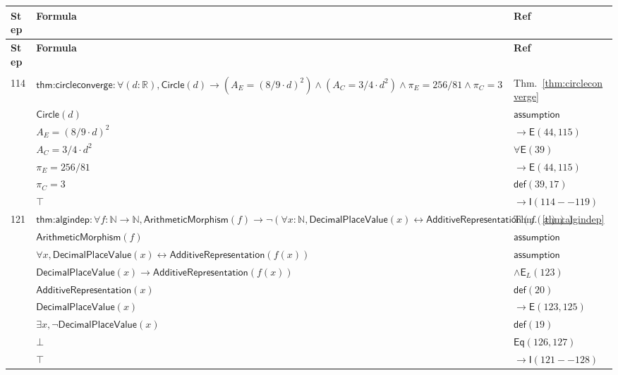 \documentclass[12pt]{amsart}
\newcommand{\br}{,\allowbreak}
\newcommand{\R}{\mathbb{R}}
\newcommand{\N}{\mathbb{N}}
\newenvironment{prooftable}{%
	\renewcommand{\arraystretch}{1.2}%
	\setlength{\tabcolsep}{4pt}%
	\setlength{\arrayrulewidth}{0.05pt}
	\tiny
	\sloppy
	\begin{longtable}{
			|>{\centering\arraybackslash}m{0.7cm}|
			>{\raggedright\centering\arraybackslash}m{0.70\textwidth}|
			>{\centering\arraybackslash}m{3.5cm}|  %
		}%
		\hline
		\textbf{Step} & \centering\textbf{Formula} & \textbf{Ref} \\
		\hline
		\endfirsthead
		\hline
		\textbf{Step} & \centering\textbf{Formula} & \textbf{Ref} \\
		\hline
		\endhead
		\hline
		\multicolumn{3}{r}{\textit{Continued on next page}} \\
		\endfoot
		\hline
		\endlastfoot
	}{%
	\end{longtable}%
}
\newcommand{\thicksoliddoubleline}{%
	\noalign{\vskip1pt}%
	\noalign{\hrule height 0.2pt}%
	\noalign{\vskip0.2pt}%
	\noalign{\hrule height 0.2pt}%
	\noalign{\vskip1pt}%
}
\begin{document}
\begin{prooftable}
	\thicksoliddoubleline
	114 & $\textsf{thm:circleconverge}: \forall(d:\R) \br  \textsf{Circle}(d) \to \left(A_E=(8/9\cdot d)^2\right)\land \left(A_C=3/4\cdot d^2\right)\land \pi_E=256/81\land \pi_C=3$ & Thm.~\ref{thm:circleconverge} \\
	\hdashline
	115 & $\textsf{Circle}(d)$ & $\mathsf{assumption}$ \\
	\hdashline
	116 & $A_E=(8/9\cdot d)^2$ & $\to \mathsf{E}(44 \br 115)$ \\
	\hdashline
	117 & $A_C=3/4\cdot d^2$ & $\forall \mathsf{E}(39)$ \\
	\hdashline
	118 & $\pi_E=256/81$ & $\to \mathsf{E}(44 \br 115)$ \\
	\hdashline
	119 & $\pi_C=3$ & $\mathsf{def}(39 \br 17)$ \\
	\hdashline
	120 & $\top$ & $\to \mathsf{I}(114--119)$ \\
	
	\thicksoliddoubleline
	121 & $\textsf{thm:algindep}: \forall f:\N\to\N \br  \textsf{ArithmeticMorphism}(f) \to \neg(\forall x:\N \br  \textsf{DecimalPlaceValue}(x)\leftrightarrow \textsf{AdditiveRepresentation}(f(x)))$ & Thm.~\ref{thm:algindep} \\
	\hdashline
	122 & $\textsf{ArithmeticMorphism}(f)$ & $\mathsf{assumption}$ \\
	\hdashline
	123 & $\forall x \br  \textsf{DecimalPlaceValue}(x) \leftrightarrow \textsf{AdditiveRepresentation}(f(x))$ & $\mathsf{assumption}$ \\
	\hdashline
	124 & $\textsf{DecimalPlaceValue}(x) \to \textsf{AdditiveRepresentation}(f(x))$ & $\land \mathsf{E}_L(123)$ \\
	\hdashline
	125 & $\textsf{AdditiveRepresentation}(x)$ & $\mathsf{def}(20)$ \\
	\hdashline
	126 & $\textsf{DecimalPlaceValue}(x)$ & $\to \mathsf{E}(123 \br 125)$ \\
	\hdashline
	127 & $\exists x \br  \neg \textsf{DecimalPlaceValue}(x)$ & $\mathsf{def}(19)$ \\
	\hdashline
	128 & $\bot$ & $\mathsf{Eq}(126 \br 127)$ \\
	\hdashline
	129 & $\top$ & $\to \mathsf{I}(121--128)$ \\
	

\end{prooftable}
\end{document}
